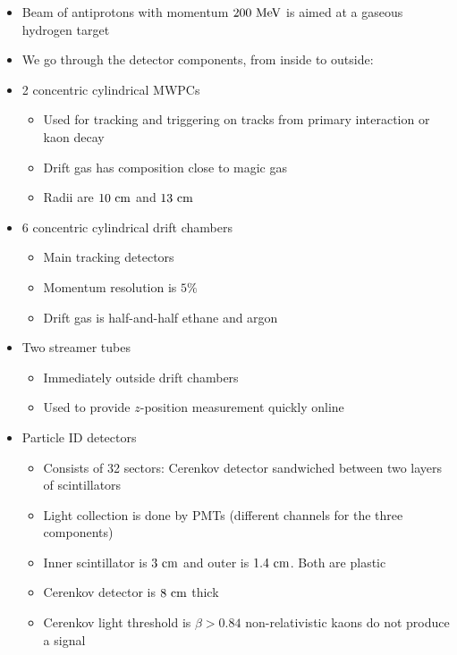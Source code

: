 \begin{itemize}
  \item Beam of antiprotons with momentum $200~\text{MeV}$ is aimed at a gaseous hydrogen target
  \item We go through the detector components, from inside to outside:
  \item 2 concentric cylindrical MWPCs
  \begin{itemize}
    \item Used for tracking and triggering on tracks from primary interaction or kaon decay
    \item Drift gas has composition close to magic gas
    \item Radii are $10~\text{cm}$ and $13~\text{cm}$
  \end{itemize}
  \item 6 concentric cylindrical drift chambers
  \begin{itemize}
    \item Main tracking detectors
    \item Momentum resolution is $5\%$
    \item Drift gas is  half-and-half ethane and argon
  \end{itemize}
  \item Two streamer tubes 
  \begin{itemize}
    \item Immediately outside drift chambers
    \item Used to provide $z$-position measurement quickly online
  \end{itemize}
  \item Particle ID detectors
  \begin{itemize}
    \item Consists of 32 sectors: Cerenkov detector sandwiched between two layers of scintillators
    \item Light collection is done by PMTs (different channels for the three components)
    \item Inner scintillator is $3~\text{cm}$ and outer is $1.4~\text{cm}$. Both are plastic
    \item Cerenkov detector is $8~\text{cm}$ thick
    \item Cerenkov light threshold is $\beta>0.84$ \thus non-relativistic kaons do not produce a signal
  \end{itemize}
\end{itemize}

